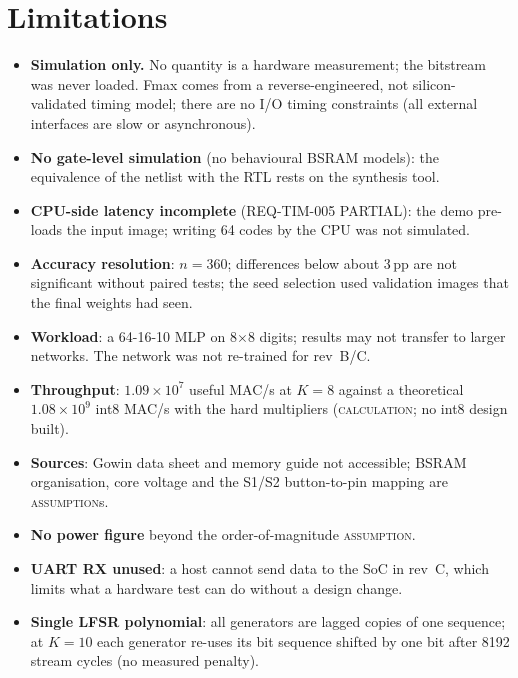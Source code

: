 \documentclass[10pt,a4paper]{article}
\newcommand{\lbl}[1]{\textsc{#1}}          %
\begin{document}
\section{Limitations}
\label{sec:limits}
\begin{itemize}
\item \textbf{Simulation only.} No quantity is a hardware measurement; the
  bitstream was never loaded. Fmax comes from a reverse-engineered,
  not silicon-validated timing model; there are no I/O timing constraints
  (all external interfaces are slow or asynchronous).
\item \textbf{No gate-level simulation} (no behavioural BSRAM models): the
  equivalence of the netlist with the RTL rests on the synthesis tool.
\item \textbf{CPU-side latency incomplete} (REQ-TIM-005 PARTIAL): the demo
  pre-loads the input image; writing 64 codes by the CPU was not simulated.
\item \textbf{Accuracy resolution}: $n=360$; differences below about 3\,pp
  are not significant without paired tests; the seed selection used
  validation images that the final weights had seen.
\item \textbf{Workload}: a 64-16-10 MLP on 8$\times$8 digits; results may not
  transfer to larger networks. The network was not re-trained for rev~B/C.
\item \textbf{Throughput}: $1.09\times10^7$ useful MAC/s at $K=8$ against a
  theoretical $1.08\times10^9$ int8 MAC/s with the hard multipliers
  (\lbl{calculation}; no int8 design built).
\item \textbf{Sources}: Gowin data sheet and memory guide not accessible; BSRAM
  organisation, core voltage and the S1/S2 button-to-pin mapping are
  \lbl{assumption}s.
\item \textbf{No power figure} beyond the order-of-magnitude
  \lbl{assumption}.
\item \textbf{UART RX unused}: a host cannot send data to the SoC in rev~C,
  which limits what a hardware test can do without a design change.
\item \textbf{Single LFSR polynomial}: all generators are lagged copies of one
  sequence; at $K=10$ each generator re-uses its bit sequence shifted by one
  bit after 8192 stream cycles (no measured penalty).
\end{itemize}
\end{document}
